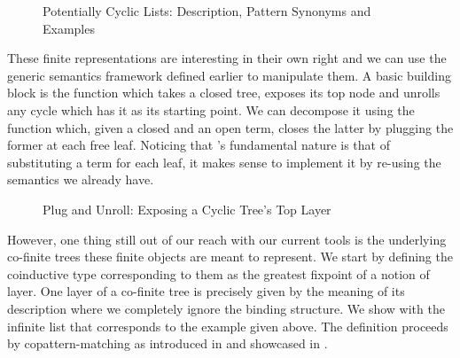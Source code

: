 \begin{figure}[h]
\begin{minipage}{0.55\textwidth}
\end{minipage}\hfill
\begin{minipage}{0.35\textwidth}
\end{minipage}
\caption{Potentially Cyclic Lists: Description, Pattern Synonyms and Examples}
\end{figure}

These finite representations are interesting in their own right
and we can use the generic semantics framework defined earlier
to manipulate them. A basic building block is the 
function which takes a closed tree, exposes its top node and
unrolls any cycle which has it as its starting point. We can
decompose it using the  function which, given a closed
and an open term, closes the latter by plugging the former at
each free  leaf. Noticing that 's fundamental nature
is that of substituting a term for each leaf, it makes sense to
implement it by re-using the  semantics we already have.

\begin{figure}[h]
\begin{minipage}{0.52\textwidth}
\end{minipage}\hspace{2em}
\begin{minipage}{0.43\textwidth}
\end{minipage}
\caption{Plug and Unroll: Exposing a Cyclic Tree's Top Layer}
\end{figure}

However, one thing still out of our reach with our current tools
is the underlying co-finite trees these finite objects are meant
to represent. We start by defining the coinductive type
corresponding to them as the greatest fixpoint of a notion of
layer. One layer of a co-finite tree is precisely given by the
meaning of its description where we completely ignore the binding
structure. We show with  the infinite list that
corresponds to the example  given above. The definition
proceeds by copattern-matching as introduced in \cite{abel2013copatterns}
and showcased in \cite{thibodeau2016case}.

